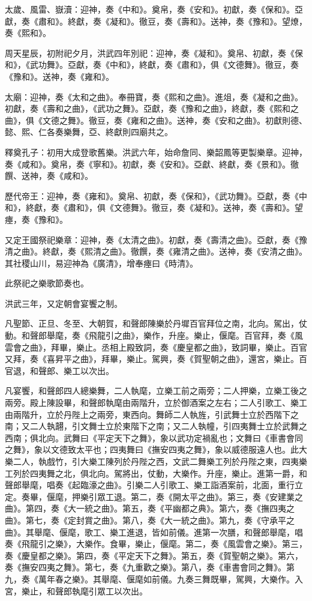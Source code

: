 太歲、風雷、嶽瀆：迎神，奏《中和》。奠帛，奏《安和》。初獻，奏《保和》。亞獻，奏《肅和》。終獻，奏《凝和》。徹豆，奏《壽和》。送神，奏《豫和》。望燎，奏《熙和》。

周天星辰，初附祀夕月，洪武四年別祀：迎神，奏《凝和》。奠帛、初獻，奏《保和》，《武功舞》。亞獻，奏《中和》，終獻，奏《肅和》，俱《文德舞》。徹豆，奏《豫和》。送神，奏《雍和》。

太廟：迎神，奏《太和之曲》。奉冊寶，奏《熙和之曲》。進俎，奏《凝和之曲》。初獻，奏《壽和之曲》，《武功之舞》。亞獻，奏《豫和之曲》，終獻，奏《熙和之曲》，俱《文德之舞》。徹豆，奏《雍和之曲》。送神，奏《安和之曲》。初獻則德、懿、熙、仁各奏樂舞，亞、終獻則四廟共之。

釋奠孔子：初用大成登歌舊樂。洪武六年，始命詹同、樂韶鳳等更製樂章。迎神，奏《咸和》。奠帛，奏《寧和》。初獻，奏《安和》。亞獻、終獻，奏《景和》。徹饌、送神，奏《咸和》。

歷代帝王：迎神，奏《雍和》。奠帛、初獻，奏《保和》，《武功舞》。亞獻，奏《中和》，終獻，奏《肅和》，俱《文德舞》。徹豆，奏《凝和》。送神，奏《壽和》。望瘞，奏《豫和》。

又定王國祭祀樂章：迎神，奏《太清之曲》。初獻，奏《壽清之曲》。亞獻，奏《豫清之曲》。終獻，奏《熙清之曲》。徹饌，奏《雍清之曲》。送神，奏《安清之曲》。其社稷山川，易迎神為《廣清》，增奉瘞曰《時清》。

此祭祀之樂歌節奏也。

洪武三年，又定朝會宴饗之制。

凡聖節、正旦、冬至、大朝賀，和聲郎陳樂於丹墀百官拜位之南，北向。駕出，仗動。和聲郎舉麾，奏《飛龍引之曲》，樂作，升座。樂止，偃麾。百官拜，奏《風雲會之曲》，拜畢，樂止。丞相上殿致詞，奏《慶皇都之曲》，致詞畢，樂止。百官又拜，奏《喜昇平之曲》，拜畢，樂止。駕興，奏《賀聖朝之曲》，還宮，樂止。百官退，和聲郎、樂工以次出。

凡宴饗，和聲郎四人總樂舞，二人執麾，立樂工前之兩旁；二人押樂，立樂工後之兩旁。殿上陳設畢，和聲郎執麾由兩階升，立於御酒案之左右；二人引歌工、樂工由兩階升，立於丹陛上之兩旁，東西向。舞師二人執旌，引武舞士立於西階下之南；又二人執翿，引文舞士立於東階下之南；又二人執幢，引四夷舞士立於武舞之西南；俱北向。武舞曰《平定天下之舞》，象以武功定禍亂也；文舞曰《車書會同之舞》，象以文德致太平也；四夷舞曰《撫安四夷之舞》，象以威德服遠人也。此大樂二人，執戲竹，引大樂工陳列於丹陛之西，文武二舞樂工列於丹陛之東，四夷樂工列於四夷舞之北，俱北向。駕將出，仗動，大樂作。升座，樂止。進第一爵，和聲郎舉麾，唱奏《起臨濠之曲》。引樂二人引歌工、樂工詣酒案前，北面，重行立定。奏畢，偃麾，押樂引眾工退。第二，奏《開太平之曲》。第三，奏《安建業之曲》。第四，奏《大一統之曲》。第五，奏《平幽都之典》。第六，奏《撫四夷之曲》。第七，奏《定封賞之曲》。第八，奏《大一統之曲》。第九，奏《守承平之曲》。其舉麾、偃麾，歌工、樂工進退，皆如前儀。進第一次膳，和聲郎舉麾，唱奏《飛龍引之樂》，大樂作。食畢，樂止，偃麾。第二，奏《風雲會之樂》。第三，奏《慶皇都之樂》。第四，奏《平定天下之舞》。第五，奏《賀聖朝之樂》。第六，奏《撫安四夷之舞》。第七，奏《九重歡之樂》。第八，奏《車書會同之舞》。第九，奏《萬年春之樂》。其舉麾、偃麾如前儀。九奏三舞既畢，駕興，大樂作。入宮，樂止，和聲郎執麾引眾工以次出。

